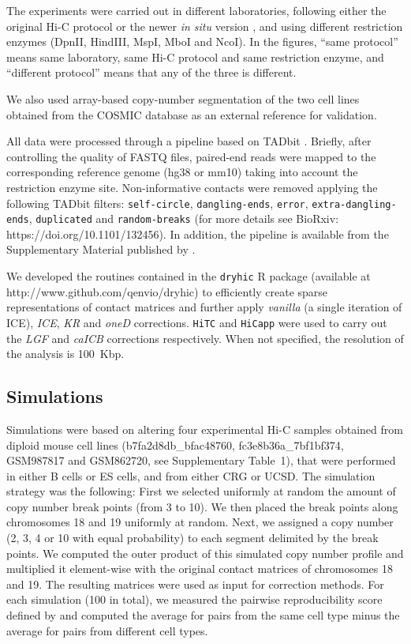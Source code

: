\documentclass[a4,center,fleqn]{NAR}
\begin{document}
The experiments were carried out in different laboratories, following
either the original Hi-C protocol \citep{lieberman2009comprehensive} or
the newer \textit{in situ} version \citep{rao20143d}, and using different
restriction enzymes (DpnII, HindIII, MspI, MboI and NcoI). In the figures,
``same protocol'' means same laboratory, same Hi-C protocol and same
restriction enzyme, and ``different protocol'' means that any of the three
is different.

We also used array-based copy-number segmentation of the two cell lines
obtained from the COSMIC database \citep{forbes2010cosmic} as an external
reference for validation.


All data were processed through a pipeline based on TADbit
\citep{serra2016structural}. Briefly, after controlling the quality of
FASTQ files, paired-end reads were mapped to the corresponding reference
genome (hg38 or mm10) taking into account the restriction enzyme site.
Non-informative contacts were removed applying the following TADbit
filters: \texttt{self-circle}, \texttt{dangling-ends}, \texttt{error},
\texttt{extra-dangling-ends}, \texttt{duplicated} and
\texttt{random-breaks} (for more details see BioRxiv:
https://doi.org/10.1101/132456). In addition, the pipeline is available
from the Supplementary Material published by \cite{quilez2017managing}.

We developed the routines contained in the \texttt{dryhic} R package
(available at http://www.github.com/qenvio/dryhic) to efficiently create
sparse representations of contact matrices and further apply
\textit{vanilla} (a single iteration of ICE), \textit{ICE}, \textit{KR} and \textit{oneD} corrections.
\texttt{HiTC} \citep{servant2012hitc} and \texttt{HiCapp}
\citep{wu2016computational} were used to carry out the \textit{LGF} and
\textit{caICB} corrections respectively. When not specified, the
resolution of the analysis is 100~Kbp.

\subsection{Simulations}


Simulations were based on altering four experimental Hi-C samples obtained
from diploid mouse cell lines (b7fa2d8db\_bfac48760, fc3e8b36a\_7bf1bf374,
GSM987817 and GSM862720, see Supplementary Table~1), that were performed
in either B cells or ES cells, and from either CRG or UCSD. The simulation
strategy was the following: First we selected uniformly at random the
amount of copy number break points (from 3 to 10). We then placed the
break points along chromosomes 18 and 19 uniformly at random. Next, we
assigned a copy number (2, 3, 4 or 10 with equal probability) to each
segment delimited by the break points. We computed the outer product of
this simulated copy number profile and multiplied it element-wise with the
original contact matrices of chromosomes 18 and 19. The resulting matrices
were used as input for correction methods. For each simulation (100 in
total), we measured the pairwise reproducibility score defined by
\cite{yan2017hicspector} and computed the average for pairs from the same
cell type minus the average for pairs from different cell types.
\end{document}

